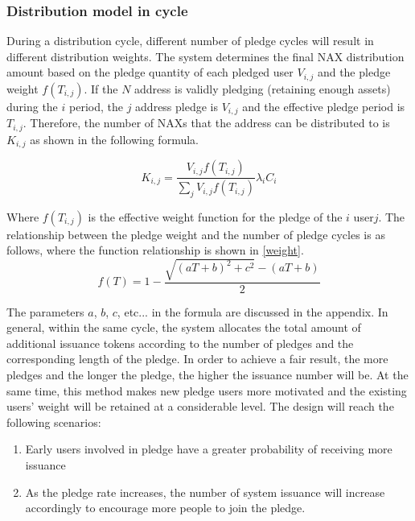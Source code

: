\subsubsection{Distribution model in cycle}
During a distribution cycle, different number of pledge cycles will result in different distribution weights. The system determines the final NAX distribution amount based on the pledge quantity of each pledged user $V_{i, j}$ and the pledge weight \(f(T_{i, j})\). If the $N$ address is validly pledging (retaining enough assets) during the $i$ period, the $j$ address pledge is $V_{i,j}$ and the effective pledge period is $T_{i,j}$. Therefore, the number of NAXs that the address can be distributed to is $K_{i,j}$ as shown in the following formula.

\begin{equation}
  K_{i,j} = \frac{V_{i,j} f(T_{i,j})}{\sum_j V_{i,j} f(T_{i,j})} \lambda_i C_i
\end{equation}



Where \(f(T_{i,j})\) is the effective weight function for the pledge of the \(i\) user\(j\). The relationship between the pledge weight and the number of pledge cycles is as follows, where the function relationship is shown in \ref{weight}.
  \begin{equation}
    f(T) = 1 - \frac{\sqrt{(aT+b)^2+c^2}-(aT+b)}{2}
  \end{equation}

The parameters $a$, $b$, $c$, etc... in the formula are discussed in the appendix. In general, within the same cycle, the system allocates the total amount of additional issuance tokens according to the number of pledges and the corresponding length of the pledge. In order to achieve a fair result, the more pledges and the longer the pledge, the higher the issuance number will be. At the same time, this method makes new pledge users more motivated and the existing users' weight will be retained at a considerable level. The design will reach the following scenarios:

\begin{enumerate}[\hspace{1cm}(a)]
  \item Early users involved in pledge have a greater probability of receiving more issuance
  \item As the pledge rate increases, the number of system issuance will increase accordingly to encourage more people to join the pledge.
\end{enumerate}

